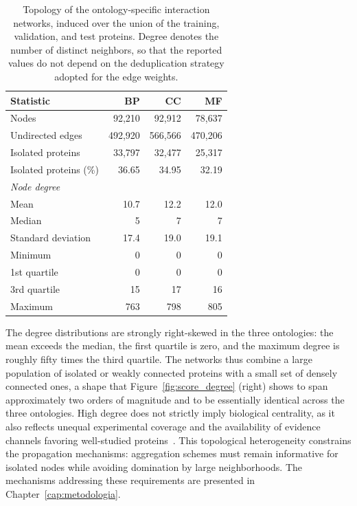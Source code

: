 \documentclass[Ingles]{ic-tese-v3}
\begin{document}
\begin{table}[!htb]
    \centering
    \caption{Topology of the ontology-specific interaction networks, induced over
    the union of the training, validation, and test proteins. Degree denotes the
    number of distinct neighbors, so that the reported values do not depend on
    the deduplication strategy adopted for the edge weights.}
    \label{tab:grafo}
    \begin{tabular}{lrrr}
    \toprule
    Statistic & BP & CC & MF \\
    \midrule
    Nodes                              & 92,210  & 92,912  & 78,637  \\
    Undirected edges                   & 492,920 & 566,566 & 470,206 \\
    Isolated proteins                  & 33,797  & 32,477  & 25,317  \\
    Isolated proteins (\%)             & 36.65   & 34.95   & 32.19   \\
    \midrule
    \multicolumn{4}{l}{\emph{Node degree}} \\
    \quad Mean                         & 10.7    & 12.2    & 12.0    \\
    \quad Median                       & 5       & 7       & 7       \\
    \quad Standard deviation           & 17.4    & 19.0    & 19.1    \\
    \quad Minimum                      & 0       & 0       & 0       \\
    \quad 1st quartile                 & 0       & 0       & 0       \\
    \quad 3rd quartile                 & 15      & 17      & 16      \\
    \quad Maximum                      & 763     & 798     & 805     \\
    \bottomrule
    \end{tabular}
\end{table}

The degree distributions are strongly right-skewed in the three ontologies: the
mean exceeds the median, the first quartile is zero, and the maximum degree is
roughly fifty times the third quartile. The networks thus combine a large
population of isolated or weakly connected proteins with a small set of densely
connected ones, a shape that Figure~\ref{fig:score_degree} (right) shows to span approximately
two orders of magnitude and to be essentially identical across the three ontologies. High degree does not strictly imply biological
centrality, as it also reflects unequal experimental coverage and the availability
of evidence channels favoring well-studied proteins~\cite{barabasi2004network}.
This topological heterogeneity constrains the propagation mechanisms: aggregation
schemes must remain informative for isolated nodes while avoiding domination by
large neighborhoods. The mechanisms addressing these requirements are presented
in Chapter~\ref{cap:metodologia}.
\end{document}
